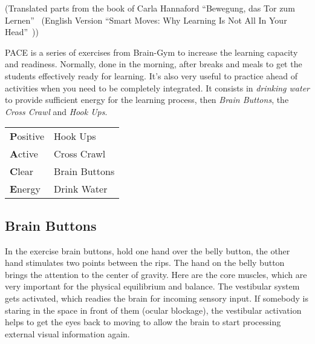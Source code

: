 \documentclass[../main.tex]{subfiles}
\begin{document}
\label{Ex:PACE}

(Translated parts from the book of Carla Hannaford ``Bewegung, das Tor zum Lernen''~\cite{BraingymD}
(English Version ``Smart Moves: Why Learning Is Not All In Your Head''~\cite{BraingymE}))

\vspace{1cm}
PACE is a series of exercises from Brain-Gym  to increase the learning capacity and
readiness.
Normally, done in the morning, after breaks and meals to get the students effectively ready for learning.
It's also very useful to practice ahead of activities when you need to be completely integrated.
It consists in \emph{drinking water} to provide sufficient energy for the learning process, then \emph{Brain Buttons}, the \emph{Cross Crawl} and \emph{Hook Ups}.


\vspace{1cm}
\begin{tabular}{ll}
\textbf{P}ositive & Hook Ups\\
\textbf{A}ctive & Cross Crawl\\
\textbf{C}lear & Brain Buttons\\
\textbf{E}nergy & Drink Water\\
\end{tabular}

\subsection{Brain Buttons}

In  the exercise brain buttons, hold one {hand over the belly button}, the other hand stimulates two points between the rips.
The hand on the {belly button} brings the attention to the {center of gravity}.
  Here are the {core muscles}, which are very important for the {physical equilibrium and balance}.
  The vestibular system gets activated, which {readies the brain for incoming sensory input}.
  If somebody is staring in the space in front of them
  ({ocular blockage}),
  the {vestibular activation} helps to get the {eyes back to moving} to allow the brain to start processing external visual information again.
\end{document}
